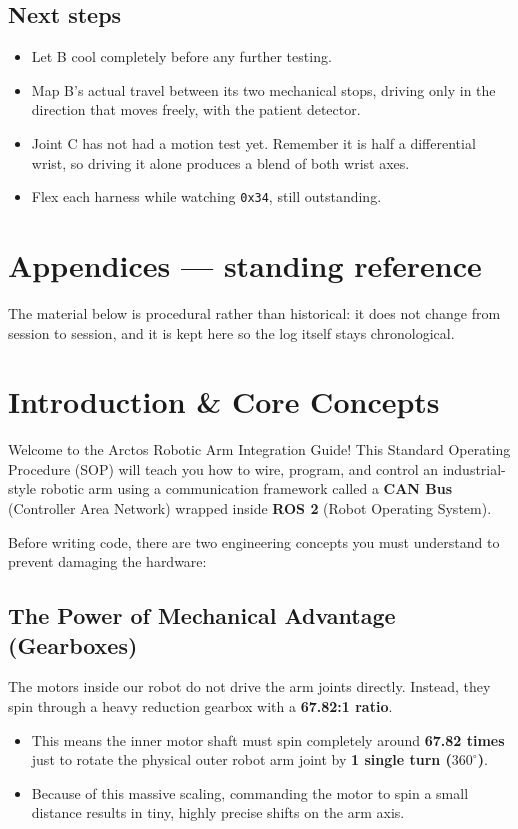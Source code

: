 \documentclass[11pt,letterpaper]{article}
\begin{document}
\subsection{Next steps}
\begin{itemize}
    \item Let B cool completely before any further testing.
    \item Map B's actual travel between its two mechanical stops, driving only
    in the direction that moves freely, with the patient detector.
    \item Joint C has not had a motion test yet. Remember it is half a
    differential wrist, so driving it alone produces a blend of both wrist axes.
    \item Flex each harness while watching \texttt{0x34}, still outstanding.
\end{itemize}

\newpage
\appendix
\section*{Appendices --- standing reference}
The material below is procedural rather than historical: it does not change from
session to session, and it is kept here so the log itself stays chronological.

\section{Introduction \& Core Concepts}
Welcome to the Arctos Robotic Arm Integration Guide! This Standard Operating Procedure (SOP) will teach you how to wire, program, and control an industrial-style robotic arm using a communication framework called a \textbf{CAN Bus} (Controller Area Network) wrapped inside \textbf{ROS 2} (Robot Operating System).

Before writing code, there are two engineering concepts you must understand to prevent damaging the hardware:

\subsection{The Power of Mechanical Advantage (Gearboxes)}
The motors inside our robot do not drive the arm joints directly. Instead, they spin through a heavy reduction gearbox with a \textbf{67.82:1 ratio}. 
\begin{itemize}
    \item This means the inner motor shaft must spin completely around \textbf{67.82 times} just to rotate the physical outer robot arm joint by \textbf{1 single turn ($360^\circ$)}.
    \item Because of this massive scaling, commanding the motor to spin a small distance results in tiny, highly precise shifts on the arm axis.
\end{itemize}
\end{document}
